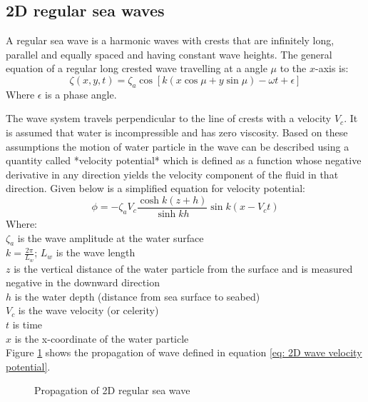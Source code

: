 \subsection{2D regular sea waves}

A regular sea wave is a harmonic waves with crests that are infinitely long,
parallel and equally spaced and having constant wave heights. The general 
equation of a regular long crested wave travelling at a angle $\mu$ to the 
$x$-axis is:
\begin{equation}
  \zeta (x,y,t) = \zeta_a \cos[k(x \cos \mu + y \sin \mu) - \omega t + \epsilon]
  \label {eq: 2D wave equation}
\end{equation}
Where $\epsilon$ is a phase angle. 

The wave system travels perpendicular to the line of crests with a velocity
$V_c$. It is assumed that water is incompressible and has zero viscosity. Based
on these assumptions the motion of water particle in the wave can be described
using a quantity called *velocity potential* which is defined as a function
whose negative derivative in any direction yields the velocity component of the
fluid in that direction. Given
below is a simplified equation for velocity potential:
\begin{equation}
  \phi = - \zeta_a V_c \frac{\cosh k(z + h)}{\sinh k h} \sin k(x - V_c t)
  \label {eq: 2D wave velocity potential}
\end{equation}
Where: \\ 
$\zeta_a$ is the wave amplitude at the water surface\\ 
$k = \frac{2 \pi}{L_w}$; $L_w$ is the wave length\\ 
$z$ is the vertical distance of the water particle from the surface and is 
measured negative in the downward direction\\ 
$h$ is the water depth (distance from sea surface to seabed)\\ 
$V_c$ is the wave velocity (or celerity)\\ 
$t$ is time\\ 
$x$ is the x-coordinate of the water particle\\
Figure \ref{fig: RegularWave-1} shows the propagation of wave defined in 
equation \ref{eq: 2D wave velocity potential}.
\begin{figure} 
  \caption{Propagation of 2D regular sea wave} 
  \label{fig: RegularWave-1} 
\end{figure}

